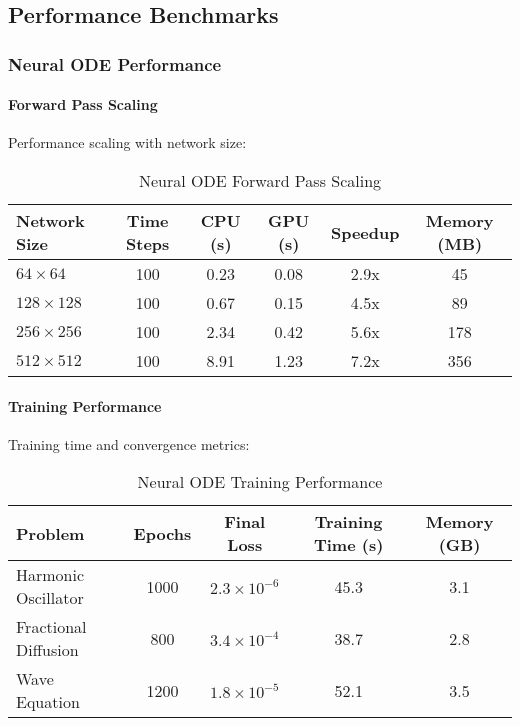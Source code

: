 \subsection{Performance Benchmarks}

\subsubsection{Neural ODE Performance}

\paragraph{Forward Pass Scaling}
Performance scaling with network size:

\begin{table}[h]
\centering
\caption{Neural ODE Forward Pass Scaling}
\begin{tabular}{lccccc}
\toprule
Network Size & Time Steps & CPU (s) & GPU (s) & Speedup & Memory (MB) \\
\midrule
$64 \times 64$ & 100 & 0.23 & 0.08 & 2.9x & 45 \\
$128 \times 128$ & 100 & 0.67 & 0.15 & 4.5x & 89 \\
$256 \times 256$ & 100 & 2.34 & 0.42 & 5.6x & 178 \\
$512 \times 512$ & 100 & 8.91 & 1.23 & 7.2x & 356 \\
\bottomrule
\end{tabular}
\end{table}

\paragraph{Training Performance}
Training time and convergence metrics:

\begin{table}[h]
\centering
\caption{Neural ODE Training Performance}
\begin{tabular}{lcccc}
\toprule
Problem & Epochs & Final Loss & Training Time (s) & Memory (GB) \\
\midrule
Harmonic Oscillator & 1000 & $2.3 \times 10^{-6}$ & 45.3 & 3.1 \\
Fractional Diffusion & 800 & $3.4 \times 10^{-4}$ & 38.7 & 2.8 \\
Wave Equation & 1200 & $1.8 \times 10^{-5}$ & 52.1 & 3.5 \\
\bottomrule
\end{tabular}
\end{table}


